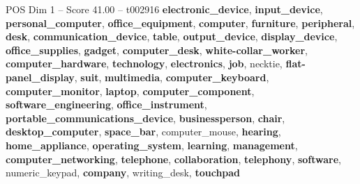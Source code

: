 \begin{textsample}{POS Dim 1 – Score 41.00 – t002916}  \label{ex:f1_pos_003}
\textbf{electronic\_device}, \textbf{input\_device}, \textbf{personal\_computer}, \textbf{office\_equipment}, \textbf{computer}, \textbf{furniture}, \textbf{peripheral}, \textbf{desk}, \textbf{communication\_device}, \textbf{table}, \textbf{output\_device}, \textbf{display\_device}, \textbf{office\_supplies}, \textbf{gadget}, \textbf{computer\_desk}, \textbf{white-collar\_worker}, \textbf{computer\_hardware}, \textbf{technology}, \textbf{electronics}, \textbf{job}, necktie, \textbf{flat-panel\_display}, \textbf{suit}, \textbf{multimedia}, \textbf{computer\_keyboard}, \textbf{computer\_monitor}, \textbf{laptop}, \textbf{computer\_component}, \textbf{software\_engineering}, \textbf{office\_instrument}, \textbf{portable\_communications\_device}, \textbf{businessperson}, \textbf{chair}, \textbf{desktop\_computer}, \textbf{space\_bar}, computer\_mouse, \textbf{hearing}, \textbf{home\_appliance}, \textbf{operating\_system}, \textbf{learning}, \textbf{management}, \textbf{computer\_networking}, \textbf{telephone}, \textbf{collaboration}, \textbf{telephony}, \textbf{software}, numeric\_keypad, \textbf{company}, writing\_desk, \textbf{touchpad}

\end{textsample}

